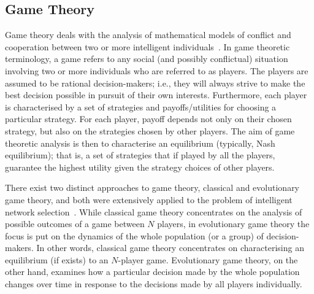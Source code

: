 
\subsection{Game Theory} %
\label{sub:game_theory_intelligent}
Game theory deals with the analysis of mathematical models of conflict and cooperation between two or more intelligent individuals~\cite{Myerson97,Gibbons92,Webb07}. In game theoretic terminology, a game refers to any social (and possibly conflictual) situation involving two or more individuals who are referred to as players. The players are assumed to be rational decision-makers; i.e., they will always strive to make the best decision possible in pursuit of their own interests. Furthermore, each player is characterised by a set of strategies and payoffs/utilities for choosing a particular strategy. For each player, payoff depends not only on their chosen strategy, but also on the strategies chosen by other players. The aim of game theoretic analysis is then to characterise an equilibrium (typically, Nash equilibrium); that is, a set of strategies that if played by all the players, guarantee the highest utility given the strategy choices of other players.

There exist two distinct approaches to game theory, classical and evolutionary game theory, and both were extensively applied to the problem of intelligent network selection~\cite{LushengKuo2013}. While classical game theory concentrates on the analysis of possible outcomes of a game between $N$ players, in evolutionary game theory the focus is put on the dynamics of the whole population (or a group) of decision-makers. In other words, classical game theory concentrates on characterising an equilibrium (if exists) to an $N$-player game. Evolutionary game theory, on the other hand, examines how a particular decision made by the whole population changes over time in response to the decisions made by all players individually.

